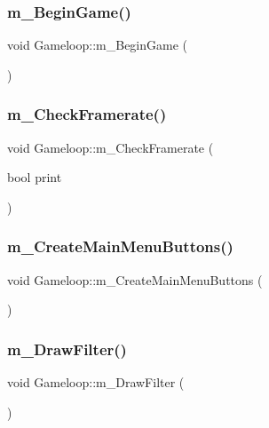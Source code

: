 \subsubsection{\texorpdfstring{m\+\_\+\+Begin\+Game()}{m\_BeginGame()}}
{\footnotesize\ttfamily void Gameloop\+::m\+\_\+\+Begin\+Game (\begin{DoxyParamCaption}{ }\end{DoxyParamCaption})}

\mbox{\label{class_gameloop_ae7b1ebe386616dd1e7c49d7132c932b9}} 
\subsubsection{\texorpdfstring{m\+\_\+\+Check\+Framerate()}{m\_CheckFramerate()}}
{\footnotesize\ttfamily void Gameloop\+::m\+\_\+\+Check\+Framerate (\begin{DoxyParamCaption}\item[{bool}]{print }\end{DoxyParamCaption})}

\mbox{\label{class_gameloop_aa519481395dbc15336ccdf0ee3c62a6e}} 
\subsubsection{\texorpdfstring{m\+\_\+\+Create\+Main\+Menu\+Buttons()}{m\_CreateMainMenuButtons()}}
{\footnotesize\ttfamily void Gameloop\+::m\+\_\+\+Create\+Main\+Menu\+Buttons (\begin{DoxyParamCaption}{ }\end{DoxyParamCaption})}

\mbox{\label{class_gameloop_a1c6fae011436c57d4009fb1d82f9aa1b}} 
\subsubsection{\texorpdfstring{m\+\_\+\+Draw\+Filter()}{m\_DrawFilter()}}
{\footnotesize\ttfamily void Gameloop\+::m\+\_\+\+Draw\+Filter (\begin{DoxyParamCaption}{ }\end{DoxyParamCaption})}

